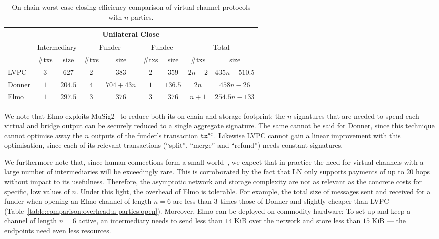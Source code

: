   \addtolength{\intextsep}{-25pt}
  \begin{table}[h!]
    \begin{minipage}{\textwidth}
    \centering
    \begin{tabular}{|l|c|c|c|c|c|c|c|c|}
    \hline
    \multicolumn{9}{|c|}{Unilateral Close} \\
    \hline
              & \multicolumn{2}{|c|}{Intermediary}
              & \multicolumn{2}{|c|}{Funder} & \multicolumn{2}{|c|}{Fundee}
              & \multicolumn{2}{|c|}{Total} \\
    \hline
              & \#txs & size & \#txs & size & \#txs & size & \#txs & size \\
    \hline
    LVPC      & $3$ & $627$ & $2$ & $383$ & $2$ & $359$ & $2n-2$ & $435n -
              510.5$ \\
    \hline
    Donner    & $1$ & $204.5$ & $4$ & $704 + 43n$ & $1$ & $136.5$ & $2n$ & $458n
              - 26$ \\
    \hline
    Elmo      & $1$ & $297.5$ & $3$ & $376$ & $3$ & $376$
              & $n+1$ & $254.5n-133$ \\
    \hline
    \end{tabular}
    \end{minipage}
    \caption{On-chain worst-case closing efficiency comparison of virtual
    channel protocols with $n$ parties.}
    \label{table:comparison:overhead:n-parties:close}
  \end{table}
  \addtolength{\intextsep}{25pt}

  We note that Elmo exploits
  MuSig2~\cite{DBLP:journals/dcc/MaxwellPSW19,DBLP:conf/crypto/NickRS21} to
  reduce both its
  on-chain and storage footprint: the $n$ signatures that are needed to spend
  each virtual and bridge output can be securely reduced to a single aggregate
  signature. The same cannot be said for
  Donner, since this technique cannot optimise away the $n$ outputs of the
  funder's transaction $\texttt{tx}^{\mathtt{vc}}$. Likewise LVPC cannot gain a linear
  improvement with this optimisation, since each of its relevant transactions
  (``split'', ``merge'' and ``refund'') needs constant signatures.

  We furthermore note that, since human connections form a
  small world~\cite{smallworld}, we expect that in practice the
  need for virtual channels with a large number of
  intermediaries will be exceedingly rare. This is corroborated by
  the fact that LN only supports payments of up to $20$ hops
  without impact to its usefulness. Therefore, the asymptotic
  network and storage complexity are not as relevant as the
  concrete costs for specific, low values of $n$. Under this
  light, the overhead of Elmo is tolerable. For example, the
  total size of messages sent and received for a funder when opening an Elmo channel
  of length $n=6$ are less than $3$ times those of Donner and
  slightly cheaper than LVPC
  (Table~\ref{table:comparison:overhead:n-parties:open}).
  Moreover, Elmo can be deployed on commodity hardware: To set up
  and keep a channel of length $n=6$ active, an intermediary needs to send less
  than $14$ KiB over the network and store less than $15$ KiB --- the endpoints
  need even less resources.

